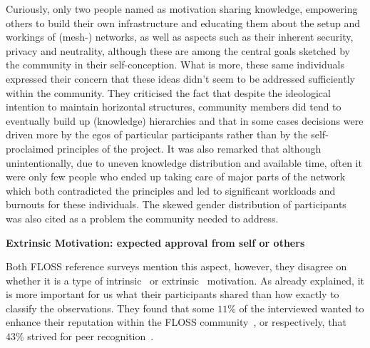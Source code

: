 \documentclass{scrartcl}
\begin{document}
Curiously, only two people named as motivation sharing knowledge, empowering others to build their own infrastructure and educating them about the setup and workings of (mesh-) networks, as well as aspects such as their inherent security, privacy and neutrality, although these are among the central goals sketched by the community in their self-conception\cite{ffweb}.
What is more, these same individuals expressed their concern that these ideas didn't seem to be addressed sufficiently within the community.
They criticised the fact that despite the ideological intention to maintain horizontal structures, community members did tend to eventually build up (knowledge) hierarchies and that in some cases decisions were driven more by the egos of particular participants rather than by the self-proclaimed principles of the project.
It was also remarked that although unintentionally, due to uneven knowledge distribution and available time, often it were only few people who ended up taking care of major parts of the network which both contradicted the principles and led to significant workloads and burnouts for these individuals.
The skewed gender distribution of participants was also cited as a problem the community needed to address.

\begin{comment}
Many of the interviewed only started to actively participate in Freifunk after attending some kind of event: be it a local community meeting, meeting activists at the Chaos Communication Congress or other kinds of conferences.
\end{comment}

\textbf{Extrinsic Motivation: expected approval from self or others}

Both FLOSS reference surveys mention this aspect, however, they disagree on whether it is a type of intrinsic~\cite{LakWo2005} or extrinsic~\cite{HarOu2002} motivation.
As already explained, it is more important for us what their participants shared than how exactly to classify the observations.
They found that some $11\%$ of the interviewed wanted to enhance their reputation within the FLOSS community~\cite{LakWo2005}, or respectively, that $43\%$ strived for peer recognition~\cite{HarOu2002}.
\end{document}
